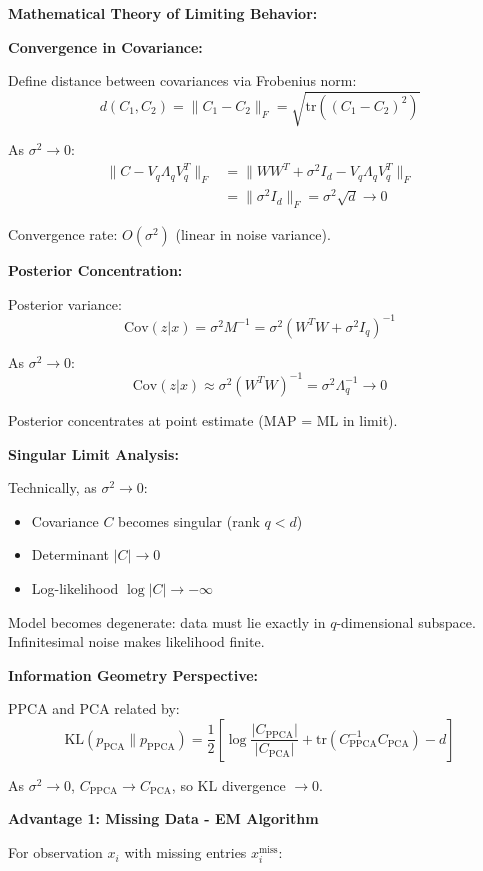 \documentclass[12pt]{article}
\begin{document}
\begin{explanation}

\textbf{Mathematical Theory of Limiting Behavior:}

\textbf{Convergence in Covariance:}

Define distance between covariances via Frobenius norm:
\[
d(C_1, C_2) = \|C_1 - C_2\|_F = \sqrt{\text{tr}((C_1 - C_2)^2)}
\]

As $\sigma^2 \to 0$:
\begin{align*}
\|C - V_q\Lambda_qV_q^T\|_F &= \|WW^T + \sigma^2 I_d - V_q\Lambda_qV_q^T\|_F \\
&= \|\sigma^2 I_d\|_F = \sigma^2\sqrt{d} \to 0
\end{align*}

Convergence rate: $O(\sigma^2)$ (linear in noise variance).

\textbf{Posterior Concentration:}

Posterior variance:
\[
\text{Cov}(z|x) = \sigma^2 M^{-1} = \sigma^2(W^TW + \sigma^2I_q)^{-1}
\]

As $\sigma^2 \to 0$:
\[
\text{Cov}(z|x) \approx \sigma^2(W^TW)^{-1} = \sigma^2 \Lambda_q^{-1} \to 0
\]

Posterior concentrates at point estimate (MAP = ML in limit).

\textbf{Singular Limit Analysis:}

Technically, as $\sigma^2 \to 0$:
\begin{itemize}
    \item Covariance $C$ becomes singular (rank $q < d$)
    \item Determinant $|C| \to 0$
    \item Log-likelihood $\log|C| \to -\infty$
\end{itemize}

Model becomes degenerate: data must lie exactly in $q$-dimensional subspace. Infinitesimal noise makes likelihood finite.

\textbf{Information Geometry Perspective:}

PPCA and PCA related by:
\[
\text{KL}(p_{\text{PCA}} \| p_{\text{PPCA}}) = \frac{1}{2}\left[\log\frac{|C_{\text{PPCA}}|}{|C_{\text{PCA}}|} + \text{tr}(C_{\text{PPCA}}^{-1}C_{\text{PCA}}) - d\right]
\]

As $\sigma^2 \to 0$, $C_{\text{PPCA}} \to C_{\text{PCA}}$, so KL divergence $\to 0$.

\textbf{Advantage 1: Missing Data - EM Algorithm}

For observation $x_i$ with missing entries $x_i^{\text{miss}}$:


\end{explanation}
\end{document}
